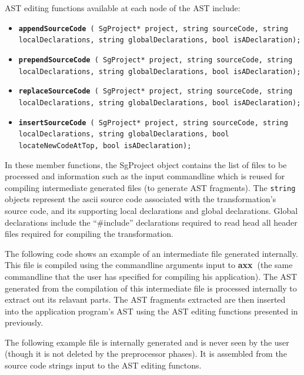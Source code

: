 \documentclass[10pt]{article}
\newcommand{\axx}{{\bf axx\ }}
\begin{document}
AST editing functions available at each node of the AST include:
\begin{itemize}
    \item {\tt {\bf appendSourceCode} ( SgProject* project, string sourceCode, 
                             string localDeclarations, string globalDeclarations, bool isADeclaration);}
    \item {\tt {\bf prependSourceCode} ( SgProject* project, string sourceCode, 
                             string localDeclarations, string globalDeclarations, bool isADeclaration);}
    \item {\tt {\bf replaceSourceCode} ( SgProject* project, string sourceCode, 
                             string localDeclarations, string globalDeclarations, bool isADeclaration);}
    \item {\tt {\bf insertSourceCode} ( SgProject* project, string sourceCode, 
                             string localDeclarations, string globalDeclarations, bool locateNewCodeAtTop, bool isADeclaration);}
\end{itemize}

   In these member functions, the SgProject object contains the list of files to be processed and
information such as the input commandline which is reused for compiling intermediate generated files
(to generate AST fragments).  The {\tt string} objects represent the ascii source code associated with the
transformation's source code, and its supporting local declarations and global declarations.  Global declarations
include the ``\#include'' declarations required to read head all header files required for compiling the transformation.

The following code shows an example of an intermediate file generated internally.  This file is compiled using the 
commandline arguments input to \axx (the same commandline that the user has specified for compiling his application).
The AST generated from the compilation of this intermediate file is processed internally to extract out its relavant parts.
The AST fragments extracted are then inserted into the application program's AST using the AST editing functions presented in 
previously.

   The following example file is internally generated and is never seen by the user (though it is
not deleted by the preprocessor phases). It is assembled from the source code strings input to the
AST editing functons.

\vspace{0.5in}
\end{document}
